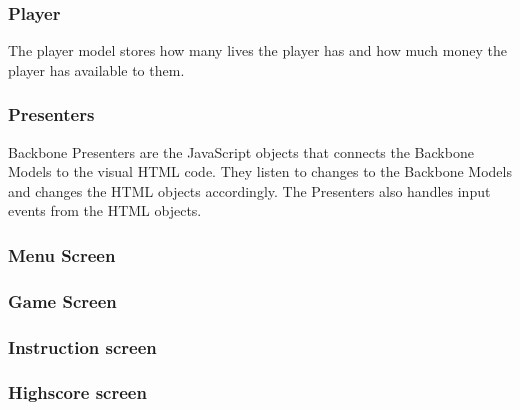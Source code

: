 \subsubsection*{Player} 
The player model stores how many lives the player has and how much money the player has available to them.

\subsubsection{Presenters}
Backbone Presenters are the JavaScript objects that connects the Backbone Models to the visual HTML code. 
They listen to changes to the Backbone Models and changes the HTML objects accordingly. The Presenters also 
handles input events from the HTML objects.
\subsubsection*{Menu Screen}

\subsubsection*{Game Screen}
\subsubsection*{Instruction screen}
\subsubsection*{Highscore screen}

